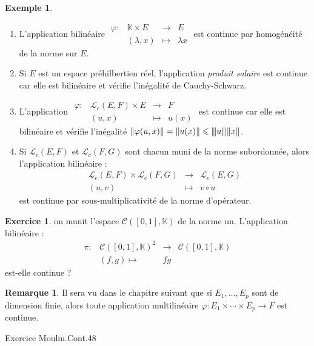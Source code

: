 \documentclass[french]{article}
\newcommand{\K}{\mathbb{K}}
\newcommand{\vertiii}[1]{{\left\vert\kern-0.25ex\left\vert\kern-0.25ex\left\vert #1 \right\vert\kern-0.25ex\right\vert\kern-0.25ex\right\vert}}
\theoremstyle{plain}
\theoremstyle{definition}
\newtheorem*{ex}{Exemple}
\newtheorem{exo}{Exercice}
\newtheorem*{rmq}{Remarque}
\theoremstyle{remark}
\begin{document}
\begin{ex}
	\begin{enumerate}
		\item L'application bilinéaire $\begin{array}{lrcl}
			\varphi:&\K\times E&\longrightarrow&E\\
			&(\lambda,x)&\longmapsto&\lambda x
		\end{array}$ est continue par homogénéité de la norme sur $E$.
		\item Si $E$ est un espace préhilbertien réel, l'application \textit{produit salaire} est continue car elle est bilinéaire et vérifie l'inégalité de Cauchy-Schwarz.
		\item L'application $\begin{array}{lrcl}
			\varphi:&\mathcal{L}_c(E,F)\times E&\longrightarrow&F\\
			&(u,x)&\longmapsto&u(x)
		\end{array}$ est continue car elle est bilinéaire et vérifie l'inégalité $\lVert\varphi(u,x)\rVert=\lVert u(x)\rVert\leqslant\vertiii{u}\lVert x\rVert$.
		\item Si $\mathcal{L}_c(E,F)$ et $\mathcal{L}_c(F,G)$ sont chacun muni de la norme subordonnée, alors l'application bilinéaire : $$\begin{array}{rcl}
			\mathcal{L}_c(E,F)\times\mathcal{L}_c(F,G)&\longrightarrow&\mathcal{L}_c(E,G)\\
			(u,v)&\longmapsto&v\circ u
		\end{array}$$ est continue par sous-multiplicativité de la norme d'opérateur.
	\end{enumerate}
\end{ex}

\begin{exo}
	on munit l'espace $\mathcal{C}([0,1],\K)$ de la norme un. L'application bilinéaire : $$\begin{array}{lrcl}
		\pi:&\mathcal{C}([0,1],\K)^2&\longrightarrow&\mathcal{C}([0,1],\K)\\
		&(f,g)\longmapsto&fg
	\end{array}$$ est-elle continue ?
\end{exo}

\begin{rmq}
	Il sera vu dans le chapitre suivant que si $E_1,\ldots,E_p$ sont de dimension finie, alors toute application multilinéaire $\varphi:E_1\times\cdots\times E_p\to F$ est continue.
\end{rmq}

Exercice Moulin.Cont.48
\end{document}
